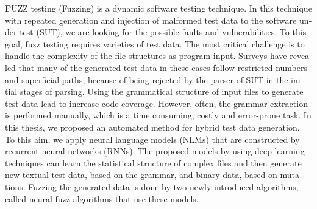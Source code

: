 \begin{latin}
{		%
	\lettrine[lines=2, nindent=.25em, slope=2pt, findent=2pt]{\textbf{F}}{UZZ} testing (Fuzzing) is a dynamic software testing technique. In this technique with repeated generation and injection of malformed test data to the software under test (SUT), we are looking for the possible faults and vulnerabilities. To this goal, fuzz testing requires varieties of test data. The most critical challenge is to handle the complexity of the file structures as program input. Surveys have revealed that many of the generated test data in these cases follow restricted numbers and superficial paths, because of being rejected by the parser of SUT in the initial stages of parsing. Using the grammatical structure of input files to generate test data lead to increase code coverage. However, often, the grammar extraction is performed manually, which is a time consuming, costly and error-prone task. In this thesis, we proposed an automated method for hybrid test data generation. To this aim, we apply neural language models (NLMs) that are constructed by recurrent neural networks (RNNs). The proposed models by using deep learning techniques can learn the statistical structure of complex files and then generate new textual test data, based on the grammar, and binary data, based on mutations. Fuzzing the generated data is done by two newly introduced algorithms, called neural fuzz algorithms that use these models. 
}
\end{latin}
